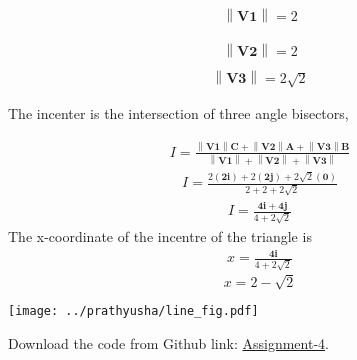 \documentclass[10pt,a4paper]{report}
\providecommand{\norm}[1]{\left\lVert#1\right\rVert}
\let\vec\mathbf
\begin{document}
\begin{multicols}{2}
 
\begin{align}
\norm{\vec{V1}}=2
\end{align}

\begin{align}
{\norm{\vec{V2}}}=2 \\
\end{align}
\begin{align}
\norm{\vec{V3}}=2\sqrt{2}
\end{align}



The incenter is the intersection of three angle bisectors,

\begin{align}
I=\frac{\norm{\vec{V1}}{\vec{C}}+\norm{\vec{V2}}{\vec{A}}+\norm{\vec{V3}}{\vec{B}}}{\norm{\vec{V1}}+\norm{\vec{V2}}+\norm{\vec{V3}}}
\end{align}
\begin{align}
I=\frac{2({\vec{2i}})+2({\vec{2j}})+2\sqrt{2}({\vec{0}})}{2+2+2\sqrt{2}}
\end{align}
\begin{align}
I=\frac{\vec{4i+4j}}{4+2\sqrt{2}}
\end{align}	 
The x-coordinate of the incentre of the triangle is
\begin{align}
x=\frac{\vec{4i}}{4+2\sqrt{2}}
\end{align}	 
\begin{equation}
x=2-\sqrt{2}
\end{equation}
\begin{center}
 \texttt{[image: ../prathyusha/line\_fig.pdf]}  
 \end{center} 
 
\raggedright  Download the code from  
Github link: \href{https://github.com/Prathyushakorepu/FWC/tree/main/Matrix/Line_assignment}{Assignment-4}.
  \end{multicols}
\end{document}

